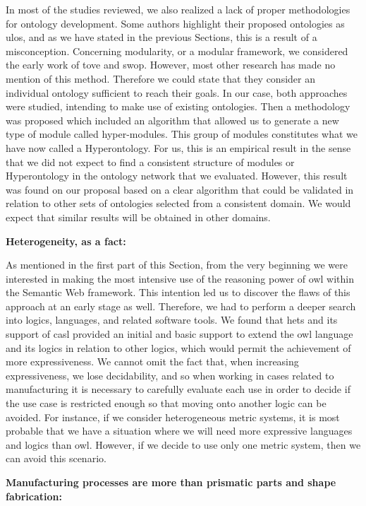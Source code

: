 In most of the studies reviewed, we also realized a lack of proper methodologies for ontology development. Some authors highlight their proposed ontologies as \gls{ulo}s, and as we have stated in the previous Sections, this is a result of a misconception. Concerning modularity, or a modular framework, we considered the early work of \gls{tove} and \gls{swop}. However, most other research has made no mention of this method. Therefore we could state that they consider an individual ontology sufficient to reach their goals. In our case, both approaches were studied, intending to make use of existing ontologies. Then a methodology was proposed which included an algorithm that allowed us to generate a new type of module called hyper-modules. This group of modules constitutes what we have now called a Hyperontology. For us, this is an empirical result in the sense that we did not expect to find a consistent structure of modules or Hyperontology in the ontology network that we evaluated. However, this result was found on our proposal based on a clear algorithm that could be validated in relation to other sets of ontologies selected from a consistent domain. We would expect that similar results will be obtained in other domains.

\noindent \textbf{Heterogeneity, as a fact:} 

As mentioned in the first part of this Section, from the very beginning we were interested in making the most intensive use of the reasoning power of \gls{owl} within the Semantic Web framework. This intention led us to discover the flaws of this approach at an early stage as well. Therefore, we had to perform a deeper search into logics, languages, and related software tools. We found that \gls{hets} and its support of \gls{casl} provided an initial and basic support to extend the \gls{owl} language and its logics in relation to other logics, which would permit the achievement of more expressiveness. We cannot omit the fact that, when increasing expressiveness, we lose decidability, and so when working in cases related to manufacturing it is necessary to carefully evaluate each use in order to decide if the use case is restricted enough so that moving onto another logic can be avoided.  For instance, if we consider heterogeneous metric systems, it is most probable that we have a situation where we will need more expressive languages and logics than \gls{owl}. However, if we decide to use only one metric system, then we can avoid this scenario.

\noindent \textbf{Manufacturing processes are more than prismatic parts and shape fabrication:}  

